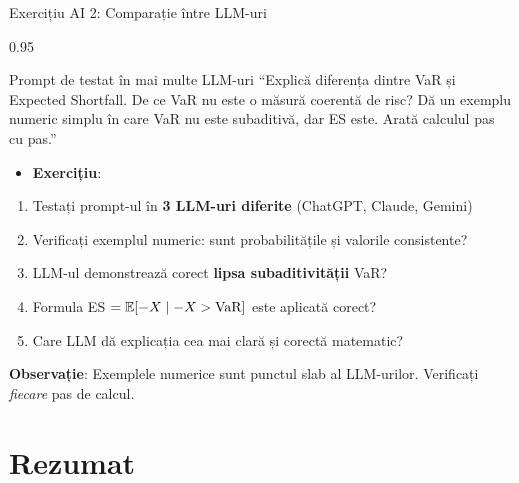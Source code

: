 \documentclass[9pt, aspectratio=169, t]{beamer}
\begin{document}
\begin{frame}{Exercițiu AI 2: Comparație între LLM-uri}
\begin{cminipage}{0.95\textwidth}
    \vspace{-3mm}
    \begin{block}{\footnotesize Prompt de testat în mai multe LLM-uri}
        {\footnotesize
        ``Explică diferența dintre VaR și Expected Shortfall. De ce VaR nu este o măsură coerentă de risc? Dă un exemplu numeric simplu în care VaR nu este subaditivă, dar ES este. Arată calculul pas cu pas.''
        }
    \end{block}
    \vspace{-2mm}
    {\footnotesize
    \begin{itemize}\setlength{\itemsep}{0pt}
        \item \textbf{Exercițiu}:
    \end{itemize}
    \begin{enumerate}\setlength{\itemsep}{0pt}
        \item Testați prompt-ul în \textbf{3 LLM-uri diferite} (ChatGPT, Claude, Gemini)
        \item Verificați exemplul numeric: sunt probabilitățile și valorile consistente?
        \item LLM-ul demonstrează corect \textbf{lipsa subaditivității} VaR?
        \item Formula ES $= \mathbb{E}[-X \mid -X > \text{VaR}]$ este aplicată corect?
        \item Care LLM dă explicația cea mai clară și corectă matematic?
    \end{enumerate}
    }
    \vspace{-2mm}
    \begin{alertblock}{}
        {\footnotesize \textbf{Observație}: Exemplele numerice sunt punctul slab al LLM-urilor. Verificați \textit{fiecare} pas de calcul.}
    \end{alertblock}
\end{cminipage}
\end{frame}

\section{Rezumat}
\end{document}
